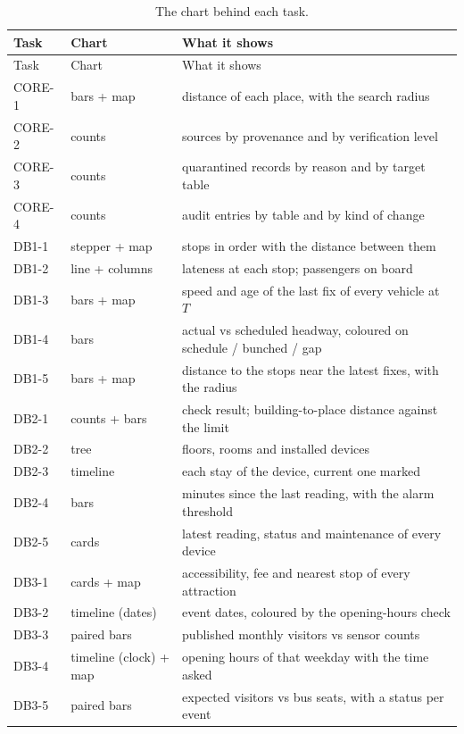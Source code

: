 \documentclass[11pt,a4paper]{article}
\begin{document}
\begingroup\small
\begin{xltabular}{\linewidth}{@{}p{1.5cm}p{3.4cm}X@{}}
\caption{The chart behind each task.}\label{tab:charts}\\
\toprule
Task & Chart & What it shows \\
\midrule
\endfirsthead
\toprule
Task & Chart & What it shows \\
\midrule
\endhead
\bottomrule
\endfoot
CORE-1 & bars + map & distance of each place, with the search radius \\
CORE-2 & counts & sources by provenance and by verification level \\
CORE-3 & counts & quarantined records by reason and by target table \\
CORE-4 & counts & audit entries by table and by kind of change \\
DB1-1 & stepper + map & stops in order with the distance between them \\
DB1-2 & line + columns & lateness at each stop; passengers on board \\
DB1-3 & bars + map & speed and age of the last fix of every vehicle at $T$ \\
DB1-4 & bars & actual vs scheduled headway, coloured on schedule / bunched / gap \\
DB1-5 & bars + map & distance to the stops near the latest fixes, with the radius \\
DB2-1 & counts + bars & check result; building-to-place distance against the limit \\
DB2-2 & tree & floors, rooms and installed devices \\
DB2-3 & timeline & each stay of the device, current one marked \\
DB2-4 & bars & minutes since the last reading, with the alarm threshold \\
DB2-5 & cards & latest reading, status and maintenance of every device \\
DB3-1 & cards + map & accessibility, fee and nearest stop of every attraction \\
DB3-2 & timeline (dates) & event dates, coloured by the opening-hours check \\
DB3-3 & paired bars & published monthly visitors vs sensor counts \\
DB3-4 & timeline (clock) + map & opening hours of that weekday with the time asked \\
DB3-5 & paired bars & expected visitors vs bus seats, with a status per event \\

\end{xltabular}
\end{document}
